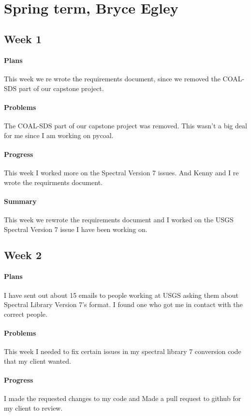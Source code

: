 \documentclass{article}
\begin{document}
\section{Spring term, Bryce Egley}
\subsection{Week 1}
\paragraph{Plans}
This week we re wrote the requirements document, since we removed the COAL-SDS part of our capstone project. 
\paragraph{Problems}
The COAL-SDS part of our capstone project was removed. This wasn't a big deal for me since I am working on pycoal. 
\paragraph{Progress}
This week I worked more on the Spectral Version 7 issues. And Kenny and I re wrote the requirments document.
\paragraph{Summary}
This week we rewrote the requirements document and I worked on the
USGS Spectral Version 7 issue I have been working on. 
\subsection{Week 2}
\paragraph{Plans}
I have sent out about 15 emails to people working at USGS asking them about Spectral Library Version 7's format. I found one who got me in contact with the correct people. 
\paragraph{Problems}
This week I needed to fix certain issues in my spectral library 7 conversion code that my client wanted. 
\paragraph{Progress}
I made the requested changes to my code and 
Made a pull request to github for my client to review.
\end{document}
